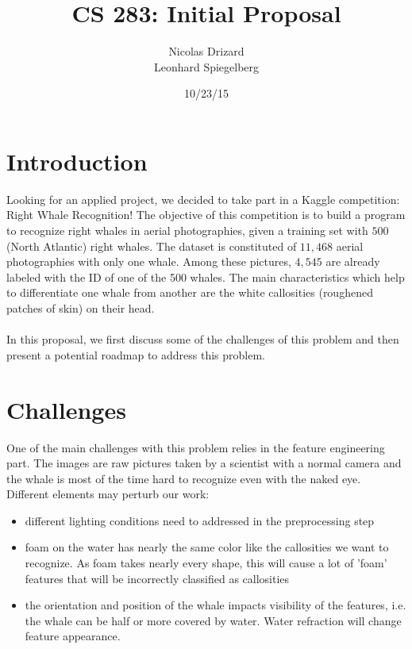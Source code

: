 \documentclass[11pt,a4paper,oneside]{report}
\begin{document}
\title{CS 283: Initial Proposal}
\author{Nicolas Drizard \\
Leonhard Spiegelberg}
\date{10/23/15}

\maketitle

\newpage

\section*{Introduction}

Looking for an applied project, we decided to take part in a Kaggle competition: Right Whale Recognition! The objective of this competition is to build a program to recognize right whales in aerial photographies, given a training set with $500$ (North Atlantic) right whales. The dataset is constituted of $11,468$ aerial photographies with only one whale. Among these pictures, $4,545$ are already labeled with the ID of one of the 500 whales. The main characteristics which help to differentiate one whale from another are the white callosities (roughened patches of skin) on their head.\\
\\

In this proposal, we first discuss some of the challenges of this problem and then present a potential roadmap to address this problem.


\section*{Challenges}

One of the main challenges with this problem relies in the feature engineering part. The images are raw pictures taken by a scientist with a normal camera and the whale is most of the time hard to recognize even with the naked eye. Different elements may perturb our work:
\begin{itemize}
	\item different lighting conditions need to addressed in the preprocessing step
	\item foam on the water has nearly the same color like the callosities we want to recognize. As foam takes nearly every shape, this will cause a lot of 'foam' features that will be incorrectly classified as callosities
	\item the orientation and position of the whale impacts visibility of the features, i.e. the whale can be half or more covered by water. Water refraction will change feature appearance.
\end{itemize}
\end{document}
